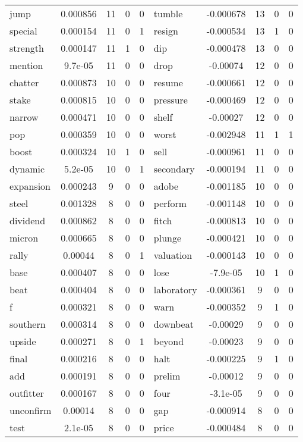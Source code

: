 \documentclass[ oneside,%
                    author={Joshua Felmeden},
                    degree={MEng},
                     title={Sentiment Analysis of Financial Headlines Based on Realised Stock Returns},
                  subtitle={Research}]{dissertation}
\begin{document}
\begin{table}[!ht]
\begin{tabular}{lcccclcccc}
jump & 0.000856 & 11 & 0 & 0 & tumble & -0.000678 & 13 & 0 & 0 \\
special & 0.000154 & 11 & 0 & 1 & resign & -0.000534 & 13 & 1 & 0 \\
strength & 0.000147 & 11 & 1 & 0 & dip & -0.000478 & 13 & 0 & 0 \\
mention & 9.7e-05 & 11 & 0 & 0 & drop & -0.00074 & 12 & 0 & 0 \\
chatter & 0.000873 & 10 & 0 & 0 & resume & -0.000661 & 12 & 0 & 0 \\
stake & 0.000815 & 10 & 0 & 0 & pressure & -0.000469 & 12 & 0 & 0 \\
narrow & 0.000471 & 10 & 0 & 0 & shelf & -0.00027 & 12 & 0 & 0 \\
pop & 0.000359 & 10 & 0 & 0 & worst & -0.002948 & 11 & 1 & 1 \\
boost & 0.000324 & 10 & 1 & 0 & sell & -0.000961 & 11 & 0 & 0 \\
dynamic & 5.2e-05 & 10 & 0 & 1 & secondary & -0.000194 & 11 & 0 & 0 \\
expansion & 0.000243 & 9 & 0 & 0 & adobe & -0.001185 & 10 & 0 & 0 \\
steel & 0.001328 & 8 & 0 & 0 & perform & -0.001148 & 10 & 0 & 0 \\
dividend & 0.000862 & 8 & 0 & 0 & fitch & -0.000813 & 10 & 0 & 0 \\
micron & 0.000665 & 8 & 0 & 0 & plunge & -0.000421 & 10 & 0 & 0 \\
rally & 0.00044 & 8 & 0 & 1 & valuation & -0.000143 & 10 & 0 & 0 \\
base & 0.000407 & 8 & 0 & 0 & lose & -7.9e-05 & 10 & 1 & 0 \\
beat & 0.000404 & 8 & 0 & 0 & laboratory & -0.000361 & 9 & 0 & 0 \\
f & 0.000321 & 8 & 0 & 0 & warn & -0.000352 & 9 & 1 & 0 \\
southern & 0.000314 & 8 & 0 & 0 & downbeat & -0.00029 & 9 & 0 & 0 \\
upside & 0.000271 & 8 & 0 & 1 & beyond & -0.00023 & 9 & 0 & 0 \\
final & 0.000216 & 8 & 0 & 0 & halt & -0.000225 & 9 & 1 & 0 \\
add & 0.000191 & 8 & 0 & 0 & prelim & -0.00012 & 9 & 0 & 0 \\
outfitter & 0.000167 & 8 & 0 & 0 & four & -3.1e-05 & 9 & 0 & 0 \\
unconfirm & 0.00014 & 8 & 0 & 0 & gap & -0.000914 & 8 & 0 & 0 \\
test & 2.1e-05 & 8 & 0 & 0 & price & -0.000484 & 8 & 0 & 0 \\

\end{tabular}
\end{table}
\end{document}
